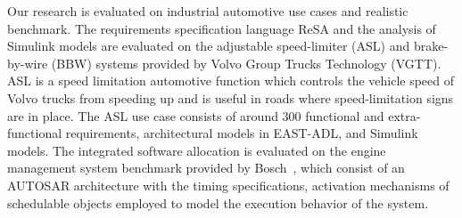 Our research is evaluated on industrial automotive use cases and realistic benchmark. The requirements specification language ReSA and the analysis of Simulink models are evaluated on the adjustable speed-limiter (ASL) and brake-by-wire (BBW) systems provided by Volvo Group Trucks Technology (VGTT). ASL is a speed limitation automotive function which controls the vehicle speed of Volvo trucks from speeding up and is useful in roads where speed-limitation signs are in place. The ASL use case consists of around 300 functional and extra-functional requirements, architectural models in EAST-ADL, and Simulink models. The integrated software allocation is evaluated on the engine management system benchmark provided by Bosch~\cite{}, which consist of an AUTOSAR architecture with the timing specifications, activation mechanisms of schedulable objects employed to model the execution behavior of the system.

